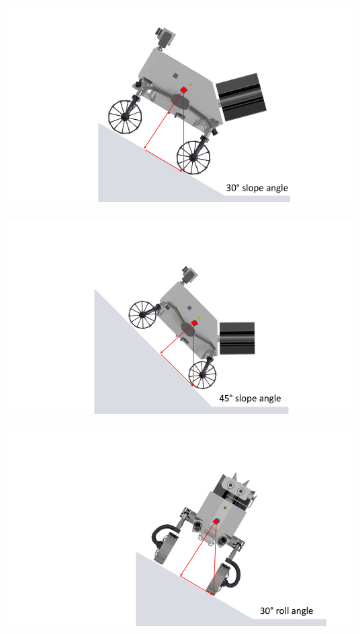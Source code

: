 \begin{figure}[htb]
     \centering
     \begin{subfigure}[b]{0.49\textwidth}
         \centering
         \includegraphics[width=\textwidth]{Media/Static1.pdf}
         \label{fig:stat1}
     \end{subfigure}
     \hfill
     \begin{subfigure}[b]{0.49\textwidth}
         \centering
         \includegraphics[width=\textwidth]{Media/Static4.pdf}
         \label{fig:stat4}
     \end{subfigure}
     \hfill
     \begin{subfigure}[b]{0.49\textwidth}
         \centering
         \includegraphics[width=\textwidth]{Media/Static2.pdf}

\end{subfigure}
\end{figure}
